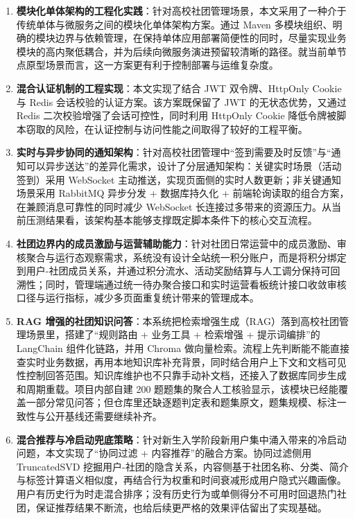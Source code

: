 \begin{enumerate}
  \item \textbf{模块化单体架构的工程化实践}：针对高校社团管理场景，本文采用了一种介于传统单体与微服务之间的模块化单体架构方案。通过 Maven 多模块组织、明确的模块边界与依赖管理，在保持单体应用部署简便性的同时，尽量实现业务模块的高内聚低耦合，并为后续向微服务演进预留较清晰的路径。就当前单节点原型场景而言，这一方案更有利于控制部署与运维复杂度。

  \item \textbf{混合认证机制的工程实现}：本文实现了结合 JWT 双令牌、HttpOnly Cookie 与 Redis 会话校验的认证方案。该方案既保留了 JWT 的无状态优势，又通过 Redis 二次校验增强了会话可控性，同时利用 HttpOnly Cookie 降低令牌被脚本窃取的风险，在认证控制与访问性能之间取得了较好的工程平衡。

  \item \textbf{实时与异步协同的通知架构}：针对高校社团管理中“签到需要及时反馈”与“通知可以异步送达”的差异化需求，设计了分层通知架构：关键实时场景（活动签到）采用 WebSocket 主动推送，实现页面侧的实时人数更新；非关键通知场景采用 RabbitMQ 异步分发 + 数据库持久化 + 前端轮询读取的组合方案，在兼顾消息可靠性的同时减少 WebSocket 长连接过多带来的资源压力。从当前压测结果看，该架构基本能够支撑既定脚本条件下的核心交互流程。

  \item \textbf{社团边界内的成员激励与运营辅助能力}：针对社团日常运营中的成员激励、审核聚合与运行态观察需求，系统没有设计全站统一积分账户，而是将积分绑定到用户-社团成员关系，并通过积分流水、活动奖励结算与人工调分保持可回溯性；同时，管理端通过统一待办聚合接口和实时运营看板统计接口收敛审核口径与运行指标，减少多页面重复统计带来的管理成本。

  \item \textbf{RAG 增强的社团知识问答}：本系统把检索增强生成（RAG）落到高校社团管理场景里，搭建了“规则路由 + 业务工具 + 检索增强 + 提示词编排”的 LangChain 组件化链路，并用 Chroma 做向量检索。流程上先判断能不能直接查实时业务数据，再用本地知识库补充背景，同时结合用户上下文和文档可见性控制回答范围。知识库维护也不只靠手动补文档，还接入了数据库同步生成和周期重载。项目内部自建 200 题题集的聚合人工核验显示，该模块已经能覆盖一部分常见问答；但仓库里还缺逐题判定表和题集原文，题集规模、标注一致性与公开基线还需要继续补齐。

  \item \textbf{混合推荐与冷启动兜底策略}：针对新生入学阶段新用户集中涌入带来的冷启动问题，本文实现了“协同过滤 + 内容推荐”的融合方案。协同过滤侧用 TruncatedSVD 挖掘用户-社团的隐含关系，内容侧基于社团名称、分类、简介与标签计算语义相似度，再结合行为权重和时间衰减形成用户隐式兴趣画像。用户有历史行为时走混合排序；没有历史行为或单侧得分不可用时回退热门社团，保证推荐结果不断流，也给后续更严格的效果评估留出了实现基础。
\end{enumerate}

